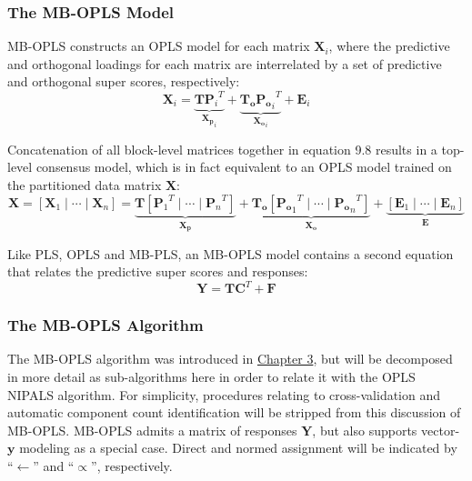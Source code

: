 \subsubsection{The MB-OPLS Model}

\begin{doublespace}
MB-OPLS constructs an OPLS model for each matrix $\mathbf{X}_i$, where the
predictive and orthogonal loadings for each matrix are interrelated by a
set of predictive and orthogonal super scores, respectively:
\begin{equation}
\mathbf{X}_i =
 \underbrace{\mathbf{T} {\mathbf{P}_i}^T}_{\mathbf{X_p}_i} +
 \underbrace{\mathbf{T_o} {\mathbf{P_o}_i}^T}_{\mathbf{X_o}_i} +
 \mathbf{E}_i
\end{equation}

Concatenation of all block-level matrices together in equation 9.8 results
in a top-level consensus model, which is in fact equivalent to an OPLS model
trained on the partitioned data matrix $\mathbf{X}$:
\begin{equation}
\mathbf{X} = [\mathbf{X}_1\mid\cdots\mid\mathbf{X}_n] =
 \underbrace{\mathbf{T} [{\mathbf{P}_1}^T\mid\cdots\mid{\mathbf{P}_n}^T]}
  _{\mathbf{X_p}} +
 \underbrace{\mathbf{T_o} [{\mathbf{P_o}_1}^T\mid\cdots\mid{\mathbf{P_o}_n}^T]}
  _{\mathbf{X_o}} +
 \underbrace{[\mathbf{E}_1\mid\cdots\mid\mathbf{E}_n]}_{\mathbf{E}}
\end{equation}

Like PLS, OPLS and MB-PLS, an MB-OPLS model contains a second equation that
relates the predictive super scores and responses:
\begin{equation}
\mathbf{Y} = \mathbf{T} \mathbf{C}^T + \mathbf{F}
\end{equation}
\end{doublespace}

\subsubsection{The MB-OPLS Algorithm}

\begin{doublespace}
The MB-OPLS algorithm was introduced in
\hyperlink{subsection.3.5.6}{Chapter 3}, but will be decomposed in more
detail as sub-algorithms here in order to relate it with the OPLS NIPALS
algorithm. For simplicity, procedures relating to cross-validation and
automatic component count identification will be stripped from this
discussion of MB-OPLS. MB-OPLS admits a matrix of responses $\mathbf{Y}$,
but also supports vector-$\mathbf{y}$ modeling as a special case. Direct
and normed assignment will be indicated by ``$\gets$'' and ``$\propto$'',
respectively.
\end{doublespace}

